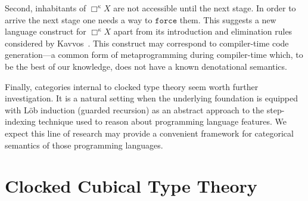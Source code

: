 \documentclass[a4paper,UKenglish,numberwithinsect,cleveref,thm-restate]{lipics-v2021}
\numberwithin{equation}{section}
\theoremstyle{plain}
\begin{document}
Second, inhabitants of $\Box^\kappa X$ are not accessible until the next stage. In order to arrive the next stage one needs a way to $\mathtt{force}$ them. 
This suggests a new language construct for $\Box^\kappa X$ apart from its introduction and elimination rules considered by Kavvos~\cite{Kavvos2017a}.
This construct may correspond to compiler-time code generation---a common form of metaprogramming during compiler-time which, to be the best of our knowledge, does not have a known denotational semantics.


Finally, categories internal to clocked type theory seem worth further investigation.
It is a natural setting when the underlying foundation is equipped with Löb induction (guarded recursion) as an abstract approach to the step-indexing technique used to reason about programming language features.
We expect this line of research may provide a convenient framework for categorical semantics of those programming languages.


%
%  



\appendix

\section{Clocked Cubical Type Theory}

%
%
%
\end{document}
